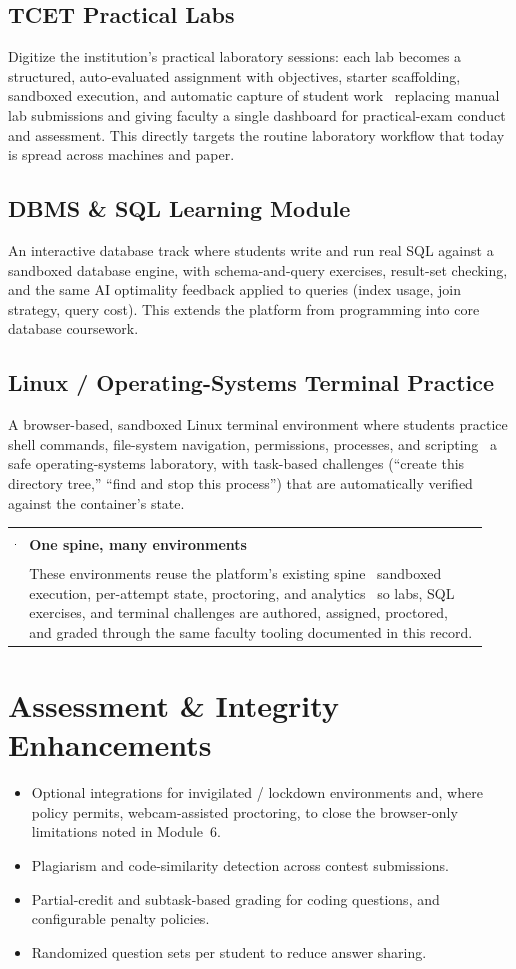 \documentclass[12pt,a4paper,oneside]{report}
\makeatletter
\newenvironment{callout}[1]{\par\vspace{4pt}\noindent
  \begin{tabular}{@{}p{0.014\linewidth}@{\hspace{0.6em}}p{0.93\linewidth}@{}}
  \textcolor{boxframe}{\rule{2pt}{\baselineskip}} & \textbf{\textcolor{tcetblue}{#1}}\\[2pt] & }{\end{tabular}\par\vspace{6pt}}
\makeatother
\begin{document}
\subsection{TCET Practical Labs}
Digitize the institution's practical laboratory sessions: each lab becomes a
structured, auto-evaluated assignment with objectives, starter scaffolding,
sandboxed execution, and automatic capture of student work \textemdash\ replacing
manual lab submissions and giving faculty a single dashboard for practical-exam
conduct and assessment. This directly targets the routine laboratory workflow
that today is spread across machines and paper.

\subsection{DBMS \& SQL Learning Module}
An interactive database track where students write and run real SQL against a
sandboxed database engine, with schema-and-query exercises, result-set checking,
and the same AI optimality feedback applied to queries (index usage, join
strategy, query cost). This extends the platform from programming into core
database coursework.

\subsection{Linux / Operating-Systems Terminal Practice}
A browser-based, sandboxed Linux terminal environment where students practice
shell commands, file-system navigation, permissions, processes, and scripting
\textemdash\ a safe operating-systems laboratory, with task-based challenges
(``create this directory tree,'' ``find and stop this process'') that are
automatically verified against the container's state.

\begin{callout}{One spine, many environments}
These environments reuse the platform's existing spine \textemdash\ sandboxed
execution, per-attempt state, proctoring, and analytics \textemdash\ so labs, SQL
exercises, and terminal challenges are authored, assigned, proctored, and graded
through the same faculty tooling documented in this record.
\end{callout}

\section{Assessment \& Integrity Enhancements}
\begin{itemize}[leftmargin=1.5em]
  \item Optional integrations for invigilated / lockdown environments and, where
        policy permits, webcam-assisted proctoring, to close the browser-only
        limitations noted in Module~6.
  \item Plagiarism and code-similarity detection across contest submissions.
  \item Partial-credit and subtask-based grading for coding questions, and
        configurable penalty policies.
  \item Randomized question sets per student to reduce answer sharing.
\end{itemize}
\end{document}
